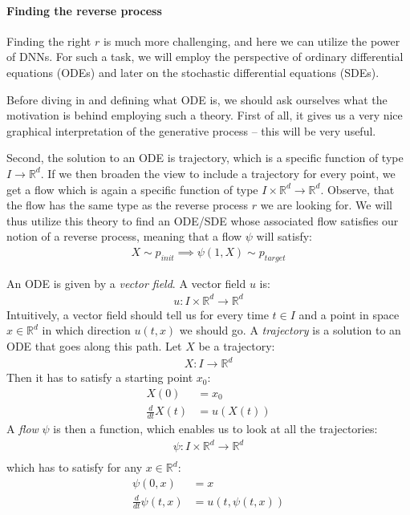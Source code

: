 \paragraph{Finding the reverse process} Finding the right $r$ is much more challenging,
and here we can utilize the power of DNNs. For such a task, we will employ the perspective of
ordinary differential equations (ODEs) and later on the stochastic differential equations (SDEs).

Before diving in and defining what ODE is, we should ask ourselves what the motivation is behind employing such a theory.
First of all, it gives us a very nice graphical interpretation of the generative process -- this will be very useful.

Second, the solution to an ODE is trajectory, which is a specific function of type $I \to \mathbb{R}^d$. If we then broaden the view to include a trajectory for every point, we get a flow which is again a specific function of type $I \times \mathbb{R}^d \to \mathbb{R}^d$. Observe, that the flow has the same type as the reverse process $r$ we are looking for. We will thus utilize this theory to find an ODE/SDE whose associated flow satisfies our notion of a reverse process, meaning that a flow $\psi$ will satisfy:
\begin{align*}
    X \sim p_{init} \implies \psi(1, X) \sim p_{target}
\end{align*}

An ODE is given by a \emph{vector field}. A vector field $u$ is:
\begin{align*}
    u : I \times \mathbb{R}^d \to \mathbb{R}^d
\end{align*}
Intuitively, a vector field should tell us for every time $t \in I$ and a point in space $x \in \mathbb{R}^d$ in which direction $u(t,x)$ we should go.
A \emph{trajectory} is a solution to an ODE that goes along this path. Let $X$ be a trajectory:
\begin{align*}
    X : I \to \mathbb{R}^d
\end{align*}
Then it has to satisfy a starting point $x_0$:
\begin{align*}
    X(0) &= x_0 \\
    \frac{d}{dt} X(t) &= u(X(t))
\end{align*}
A \emph{flow} $\psi$ is then a function, which enables us to look at all the trajectories:
\begin{align*}
    \psi : I \times \mathbb{R}^d \to \mathbb{R}^d \\
\end{align*}
which has to satisfy for any $x \in \mathbb{R}^d$:
\begin{align*}
    \psi(0, x) &= x\\
    \frac{d}{dt} \psi(t, x) &= u(t, \psi(t, x))
\end{align*}

